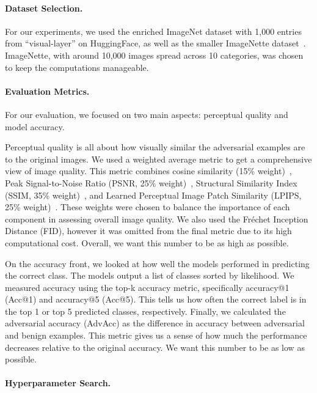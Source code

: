 \documentclass[a4paper, oneside]{discothesis}
\begin{document}
\paragraph{Dataset Selection.}

For our experiments, we used the enriched ImageNet dataset with 1,000 entries from ``visual-layer'' on HuggingFace, as well as the smaller ImageNette dataset~\cite{Howard_Imagenette_2019}. ImageNette, with around 10,000 images spread across 10 categories, was chosen to keep the computations manageable.

\paragraph{Evaluation Metrics.}

For our evaluation, we focused on two main aspects: perceptual quality and model accuracy. 

Perceptual quality is all about how visually similar the adversarial examples are to the original images. We used a weighted average metric to get a comprehensive view of image quality. This metric combines cosine similarity (15\% weight)~\cite{singhal2001modern}, Peak Signal-to-Noise Ratio (PSNR, 25\% weight)~\cite{9311108}, Structural Similarity Index (SSIM, 35\% weight)~\cite{wang2004image}, and Learned Perceptual Image Patch Similarity (LPIPS, 25\% weight)~\cite{lpips}. These weights were chosen to balance the importance of each component in assessing overall image quality. We also used the Fréchet Inception Distance (FID), however it was omitted from the final metric due to its high computational cost. Overall, we want this number to be as high as possible.

On the accuracy front, we looked at how well the models performed in predicting the correct class. The models output a list of classes sorted by likelihood. We measured accuracy using the top-k accuracy metric, specifically accuracy@1 (Acc@1) and accuracy@5 (Acc@5). This tells us how often the correct label is in the top 1 or top 5 predicted classes, respectively. Finally, we calculated the adversarial accuracy (AdvAcc) as the difference in accuracy between adversarial and benign examples. This metric gives us a sense of how much the performance decreases relative to the original accuracy. We want this number to be as low as possible.

\paragraph{Hyperparameter Search.}
\end{document}
